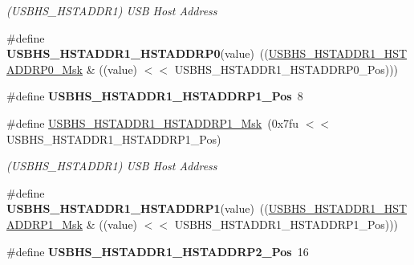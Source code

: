 \begin{DoxyCompactItemize}
\begin{DoxyCompactList}\small\item\em (U\+S\+B\+H\+S\+\_\+\+H\+S\+T\+A\+D\+D\+R1) U\+SB Host Address \end{DoxyCompactList}\item 
\mbox{\label{group__SAMS70__USBHS_ga2594cf9fe94725079ede68dd02eb1f76}} 
\#define {\bfseries U\+S\+B\+H\+S\+\_\+\+H\+S\+T\+A\+D\+D\+R1\+\_\+\+H\+S\+T\+A\+D\+D\+R\+P0}(value)~((\mbox{\hyperlink{group__SAMV71__USBHS_ga8af8a1d1df9aa442c92d6da93239944c}{U\+S\+B\+H\+S\+\_\+\+H\+S\+T\+A\+D\+D\+R1\+\_\+\+H\+S\+T\+A\+D\+D\+R\+P0\+\_\+\+Msk}} \& ((value) $<$$<$ U\+S\+B\+H\+S\+\_\+\+H\+S\+T\+A\+D\+D\+R1\+\_\+\+H\+S\+T\+A\+D\+D\+R\+P0\+\_\+\+Pos)))
\item 
\mbox{\label{group__SAMS70__USBHS_ga0ed32a30d7ad5cfe15d4f01fb85e1109}} 
\#define {\bfseries U\+S\+B\+H\+S\+\_\+\+H\+S\+T\+A\+D\+D\+R1\+\_\+\+H\+S\+T\+A\+D\+D\+R\+P1\+\_\+\+Pos}~8
\item 
\mbox{\label{group__SAMS70__USBHS_gaf80878790141adcc9d0ef83325a9d64d}} 
\#define \mbox{\hyperlink{group__SAMS70__USBHS_gaf80878790141adcc9d0ef83325a9d64d}{U\+S\+B\+H\+S\+\_\+\+H\+S\+T\+A\+D\+D\+R1\+\_\+\+H\+S\+T\+A\+D\+D\+R\+P1\+\_\+\+Msk}}~(0x7fu $<$$<$ U\+S\+B\+H\+S\+\_\+\+H\+S\+T\+A\+D\+D\+R1\+\_\+\+H\+S\+T\+A\+D\+D\+R\+P1\+\_\+\+Pos)
\begin{DoxyCompactList}\small\item\em (U\+S\+B\+H\+S\+\_\+\+H\+S\+T\+A\+D\+D\+R1) U\+SB Host Address \end{DoxyCompactList}\item 
\mbox{\label{group__SAMS70__USBHS_ga645e25792703535a45acfc8aa4244ded}} 
\#define {\bfseries U\+S\+B\+H\+S\+\_\+\+H\+S\+T\+A\+D\+D\+R1\+\_\+\+H\+S\+T\+A\+D\+D\+R\+P1}(value)~((\mbox{\hyperlink{group__SAMV71__USBHS_gaf80878790141adcc9d0ef83325a9d64d}{U\+S\+B\+H\+S\+\_\+\+H\+S\+T\+A\+D\+D\+R1\+\_\+\+H\+S\+T\+A\+D\+D\+R\+P1\+\_\+\+Msk}} \& ((value) $<$$<$ U\+S\+B\+H\+S\+\_\+\+H\+S\+T\+A\+D\+D\+R1\+\_\+\+H\+S\+T\+A\+D\+D\+R\+P1\+\_\+\+Pos)))
\item 
\mbox{\label{group__SAMS70__USBHS_ga31f13677da4dddc57bc2acd2087af67a}} 
\#define {\bfseries U\+S\+B\+H\+S\+\_\+\+H\+S\+T\+A\+D\+D\+R1\+\_\+\+H\+S\+T\+A\+D\+D\+R\+P2\+\_\+\+Pos}~16
$$
\end{DoxyCompactItemize}
